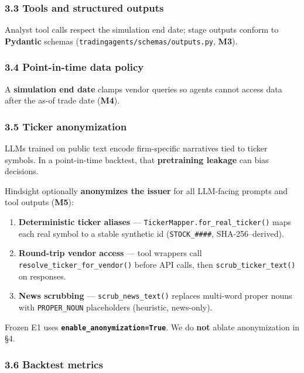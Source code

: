 \documentclass[
]{article}
\providecommand{\tightlist}{%
  \setlength{\itemsep}{0pt}\setlength{\parskip}{0pt}}
\begin{document}
\subsubsection{3.3 Tools and structured
outputs}\label{tools-and-structured-outputs}

Analyst tool calls respect the simulation end date; stage outputs
conform to \textbf{Pydantic} schemas
(\texttt{tradingagents/schemas/outputs.py}, \textbf{M3}).

\subsubsection{3.4 Point-in-time data
policy}\label{point-in-time-data-policy}

A \textbf{simulation end date} clamps vendor queries so agents cannot
access data after the as-of trade date (\textbf{M4}).

\subsubsection{3.5 Ticker anonymization}\label{ticker-anonymization}

LLMs trained on public text encode firm-specific narratives tied to
ticker symbols. In a point-in-time backtest, that \textbf{pretraining
leakage} can bias decisions.

Hindsight optionally \textbf{anonymizes the issuer} for all LLM-facing
prompts and tool outputs (\textbf{M5}):

\begin{enumerate}
\def\labelenumi{\arabic{enumi}.}
\tightlist
\item
  \textbf{Deterministic ticker aliases} ---
  \texttt{TickerMapper.for\_real\_ticker()} maps each real symbol to a
  stable synthetic id (\texttt{STOCK\_\#\#\#\#}, SHA-256--derived).
\item
  \textbf{Round-trip vendor access} --- tool wrappers call
  \texttt{resolve\_ticker\_for\_vendor()} before API calls, then
  \texttt{scrub\_ticker\_text()} on responses.
\item
  \textbf{News scrubbing} --- \texttt{scrub\_news\_text()} replaces
  multi-word proper nouns with \texttt{PROPER\_NOUN} placeholders
  (heuristic, news-only).
\end{enumerate}

Frozen E1 uses \textbf{\texttt{enable\_anonymization=True}}. We do
\textbf{not} ablate anonymization in §4.

\subsubsection{3.6 Backtest metrics}\label{backtest-metrics}
\end{document}
